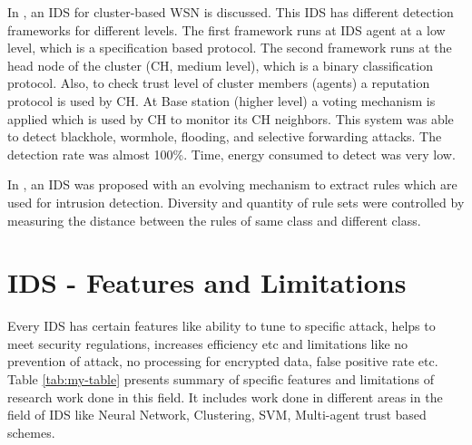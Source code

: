 \par
In \cite{sedjelmaci2013efficient}, an IDS for cluster-based WSN is discussed. This IDS has different detection frameworks for different levels. The first framework runs at IDS agent at a low level, which is a specification based protocol. The second framework runs at the head node of the cluster (CH, medium level), which is a binary classification protocol. Also, to check trust level of cluster members (agents) a reputation protocol is used by CH. At Base station (higher level) a voting mechanism is applied which is used by CH to monitor its CH neighbors. This system was able to detect blackhole, wormhole, flooding, and selective forwarding attacks. The detection rate was almost 100\%. Time, energy consumed to detect was very low.
\par
In \cite{lu2018intrusion}, an IDS was proposed with an evolving mechanism to extract rules which are used for intrusion detection. Diversity and quantity of rule sets were controlled by measuring the distance between the rules of same class and different class.

\section{IDS - Features and Limitations}
\noindent
Every IDS has certain features like ability to tune to specific attack, helps to meet security regulations, increases efficiency etc and limitations like no prevention of attack, no processing for encrypted data, false positive rate etc. Table \ref{tab:my-table} presents summary of specific features and limitations of research work done in this field. It includes work done in different areas in the field of IDS like Neural Network, Clustering, SVM, Multi-agent trust based schemes.

